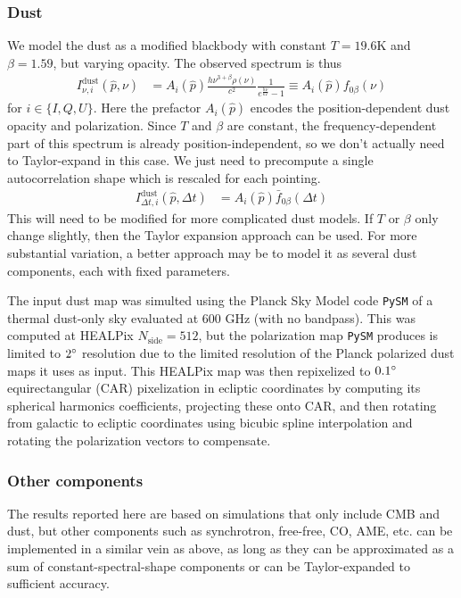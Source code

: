 \documentclass{article}
\newcommand{\code}[1]{\texttt{#1}}
\begin{document}
\subsubsection{Dust}
\label{sect:dust}
We model the dust as a modified blackbody with constant
$T=19.6$K and $\beta=1.59$, but varying opacity. The observed spectrum is thus
\begin{align}
I^\textrm{dust}_{\nu,i}(\hat p,\nu) &= A_i(\hat p) \frac{h\nu^{3+\beta}\rho(\nu)}{c^2}\frac{1}{e^{\frac{h\nu}{kT}}-1} \equiv A_i(\hat p) f_{0\beta}(\nu)
\end{align}
for $i \in \{I,Q,U\}$. Here the prefactor $A_i(\hat p)$ encodes the position-dependent
dust opacity and polarization.
Since $T$ and $\beta$ are constant, the frequency-dependent part of this spectrum is
already position-independent, so we don't actually need to Taylor-expand in this case.
We just need to precompute a single autocorrelation shape which is rescaled for each
pointing.
\begin{align}
I^\textrm{dust}_{\Delta t,i}(\hat p,\Delta t) &= A_i(\hat p) \bar f_{0\beta}(\Delta t)
\end{align}
This will need to be modified for more complicated dust models. If $T$ or $\beta$
only change slightly, then the Taylor expansion approach can be used. For more
substantial variation, a better approach may be to model it as several dust components,
each with fixed parameters.

The input dust map was simulted using the Planck Sky Model \cite{psm} code \code{PySM}
of a thermal dust-only sky evaluated at 600 GHz (with no bandpass).
This was computed at HEALPix $N_\textrm{side} = 512$, but the polarization
map \code{PySM} produces is limited to $2\degree$ resolution due to the limited
resolution of the Planck polarized dust maps it uses as input. This HEALPix map
was then repixelized to $0.1\degree$ equirectangular (CAR) pixelization in
ecliptic coordinates by computing its spherical harmonics coefficients,
projecting these onto CAR, and then rotating from galactic to ecliptic coordinates
using bicubic spline interpolation and rotating the polarization vectors to compensate.

\subsubsection{Other components}
The results reported here are based on simulations that only include CMB and dust,
but other components such as synchrotron, free-free, CO, AME, etc. can be implemented
in a similar vein as above, as long as they can be approximated as a sum of
constant-spectral-shape components or can be Taylor-expanded to sufficient accuracy.
\end{document}

